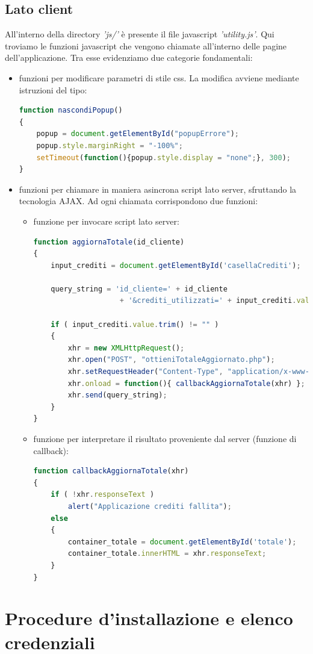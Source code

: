 \documentclass[a4paper, 14pt]{article}
\begin{document}
\begin{flushleft}
		\subsection{Lato client}
			All'interno della directory \textit{'js/'} è presente il file javascript \textit{'utility.js'}.
			Qui troviamo le funzioni javascript che vengono chiamate all'interno delle pagine dell'applicazione.
			Tra esse evidenziamo due categorie fondamentali:
			\begin{itemize}
				\item funzioni per modificare parametri di stile css. La modifica avviene mediante istruzioni del tipo:
				\begin{lstlisting}[backgroundcolor=\color{coloreSfondoGrammatiche}, language=javascript]
function nascondiPopup()
{
	popup = document.getElementById("popupErrore");
	popup.style.marginRight = "-100%";
	setTimeout(function(){popup.style.display = "none";}, 300);
}
				\end{lstlisting}
				\item funzioni per chiamare in maniera asincrona script lato server, sfruttando la tecnologia AJAX. Ad ogni chiamata corrispondono due funzioni:
					\begin{itemize}
						\item funzione per invocare script lato server:
						\begin{lstlisting}[backgroundcolor=\color{coloreSfondoGrammatiche}, language=javascript]
function aggiornaTotale(id_cliente)
{
	input_crediti = document.getElementById('casellaCrediti');
	
	query_string = 'id_cliente=' + id_cliente 
					+ '&crediti_utilizzati=' + input_crediti.value.trim();
	
	if ( input_crediti.value.trim() != "" )
	{
		xhr = new XMLHttpRequest();
		xhr.open("POST", "ottieniTotaleAggiornato.php");
		xhr.setRequestHeader("Content-Type", "application/x-www-form-urlencoded");
		xhr.onload = function(){ callbackAggiornaTotale(xhr) };
		xhr.send(query_string);
	}
}
						\end{lstlisting}
						\item funzione per interpretare il risultato proveniente dal server (funzione di callback):
						\begin{lstlisting}[backgroundcolor=\color{coloreSfondoGrammatiche}, language=javascript]
function callbackAggiornaTotale(xhr)
{
	if ( !xhr.responseText )
		alert("Applicazione crediti fallita");
	else
	{
		container_totale = document.getElementById('totale');
		container_totale.innerHTML = xhr.responseText;
	}
}
						\end{lstlisting}
					\end{itemize}
			\end{itemize}
			\newpage
	\section{Procedure d'installazione e elenco credenziali}
		
	\end{flushleft}
\end{document}
